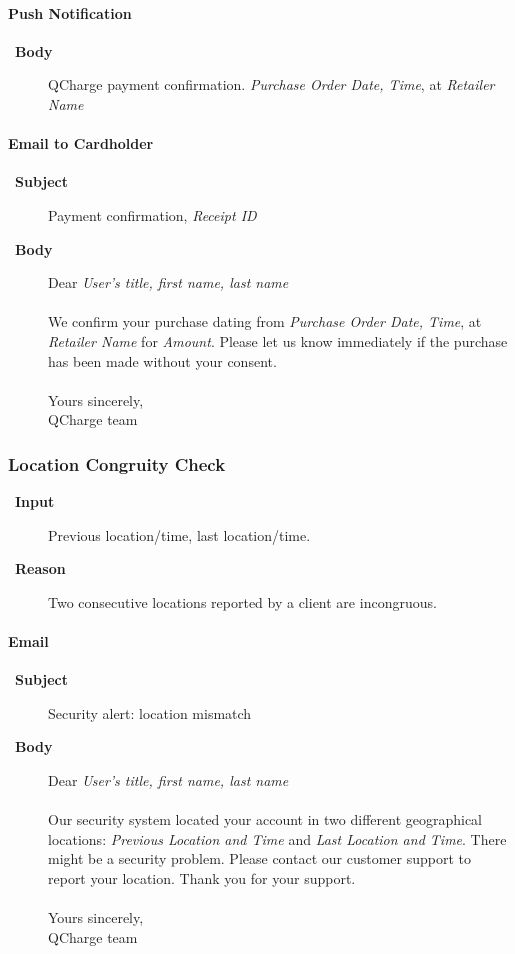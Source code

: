 \documentclass[a4paper,10pt]{article}
\let\Item\item
\newcommand\SpecialItem{\renewcommand\item[1][]{\Item[\textbullet~\bfseries##1]}
}
\begin{document}
\paragraph{Push Notification}
\SpecialItem
\begin{description}
 \item[Body] QCharge payment confirmation. \emph{Purchase Order Date, Time}, at 
\emph{Retailer Name}
\end{description}

\paragraph{Email to Cardholder}
\SpecialItem
\begin{description}
 \item[Subject] Payment confirmation, \emph{Receipt ID}
 \item[Body] Dear \emph{User's title, first name, last name}
\\\\
We confirm your purchase dating from \emph{Purchase Order Date, Time}, at 
\emph{Retailer Name} for \emph{Amount}. Please let us know immediately if the 
purchase has been made without your consent.
\\\\
Yours sincerely,\\
QCharge team
\end{description}

\subsubsection{Location Congruity Check}

\SpecialItem
\begin{description}
 \item[Input] Previous location/time, last location/time.
 \item[Reason] Two consecutive locations reported by a client are incongruous.
\end{description}

\paragraph{Email}
\SpecialItem
\begin{description}
 \item[Subject] Security alert: location mismatch
 \item[Body]Dear \emph{User's title, first name, last name}
\\\\
Our security system located your account in two different geographical 
locations: \emph{Previous Location and Time} and \emph{Last Location and 
Time}. There might be a security problem. Please contact our customer support 
to report your location. Thank you for your support.
\\\\
Yours sincerely,\\
QCharge team

\end{description}
\end{document}
